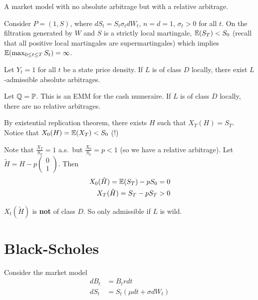 \begin{exmp}
  \label{defn:market_models:1}
  A market model with no absolute arbitrage but with a
  relative arbitrage.

  Consider $P = (1, S)$, where $dS_{t} = S_{t} \sigma_{t} dW_{t}$, $n
  = d = 1$, $\sigma_{t} > 0$ for all $t$. On the filtration generated
  by $W$ and $S$ is a strictly local martingale, $\E{S_T} < S_0$
  (recall that all positive local martingales are supermartingales)
  which implies $\E{\max_{0 \leq t \leq T} S_t} = \infty$.
\end{exmp}

\begin{defn}
  \label{defn:market_models:1}
  Let $Y_t = 1$  for all $t$ be a state price density.  If $L$ is of
  class $D$ locally, there exist $L$-admissible absolute arbitrages.
\end{defn}

\begin{defn}
  \label{defn:market_models:1}
  Let $\Q = \Prob$.  This is an EMM for the cash numeraire.  If $L$ is
  of class $D$ locally, there are no relative arbitrages.
\end{defn}

\begin{defn}
  \label{defn:market_models:2}
  By existential replication theorem, there exists $H$ such that
  $X_{T}(H) = S_{T}$.  Notice that $X_{0}(H) = \E{X_{T}} < S_{0}$ (!)
\end{defn}

Note that $\frac{X_{T}}{S_{T}} = 1$ a.s.\ but $\frac{X_{0}}{S_{0}} = p
< 1$ (so we have a relative arbitrage).  Let $\tilde H = H - p
\begin{pmatrix}
  0  \\
  1
\end{pmatrix}
$.  Then
\begin{align}
  \label{eq:86}
  X_{0}(\tilde H) = \E{S_{T}} - pS_{0} = 0 \\
  X_{T}(\tilde H) = S_{T} - p S_{T} > 0
\end{align}

$X_{t}(\tilde H)$ is \textbf{not} of class $D$.  So only admissible if
$L$ is wild.

\chapter{Black-Scholes}
\label{cha:black-scholes-1}

Consider the market model
\begin{align}
  \label{eq:87}
  dB_{t} &= B_{t} r dt \\
  dS_{t} &= S_{t}(\mu dt + \sigma dW_{t}) 
\end{align}
 
